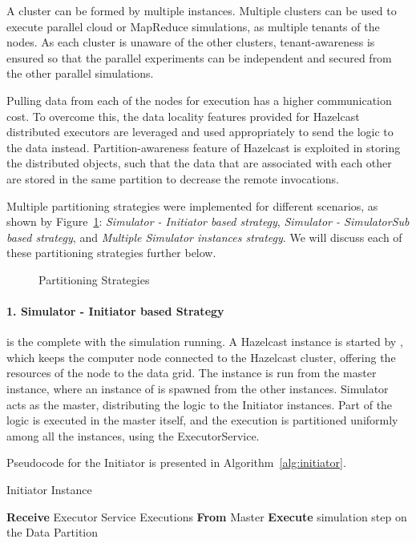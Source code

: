 A cluster can be formed by multiple instances. Multiple clusters can be used to execute parallel cloud or MapReduce simulations, as multiple tenants of the nodes. As each cluster is unaware of the other clusters, tenant-awareness is ensured so that the parallel experiments can be independent and secured from the other parallel simulations.

Pulling data from each of the nodes for execution has a higher communication cost. To overcome this, the data locality features provided for Hazelcast distributed executors are leveraged and used appropriately to send the logic to the data instead. Partition-awareness feature of Hazelcast is exploited in storing the distributed objects, such that the data that are associated with each other are stored in the same partition to decrease the remote invocations. 

Multiple partitioning strategies were implemented for different scenarios, as shown by Figure~\ref{fig:partitionapproaches}: \textit{Simulator - Initiator based strategy}, \textit{Simulator - SimulatorSub based strategy}, and \textit{Multiple Simulator instances strategy}. We will discuss each of these partitioning strategies further below.
\begin{figure}[!htbp]
\begin{center}
\end{center}
 \caption{Partitioning Strategies}
 \label{fig:partitionapproaches}
\end{figure}

\paragraph*{1. Simulator - Initiator based Strategy}
 is the complete  with the simulation running. A Hazelcast instance is started by  , which keeps the computer node connected to the Hazelcast cluster, offering the resources of the node to the data grid. The  instance is run from the master instance, where an instance of  is spawned from the other instances. Simulator acts as the master, distributing the logic to the Initiator instances. Part of the logic is executed in the master itself, and the execution is partitioned uniformly among all the instances, using the ExecutorService.

Pseudocode for the Initiator is presented in Algorithm~\ref{alg:initiator}.
\begin{algorithm}
  \caption{Initiator Instance}
\label{alg:initiator}
  \begin{algorithmic}
\State 
\While{  }
\State \textbf{Receive} Executor Service Executions \textbf{From} Master
\State \textbf{Execute} simulation step on the Data Partition
\EndWhile
\State  
  \end{algorithmic}
\end{algorithm}

